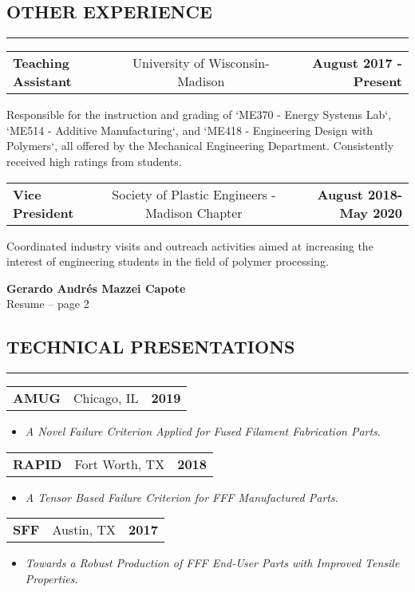 \documentclass[11pt,letterpaper]{article}
\makeatletter
\newcommand{\headerrow}[3]
{\vspace{0.4em}
\noindent
\begin{tabular*}{\textwidth}{l @{\extracolsep{\fill}} cr}
	\textbf{#1} & %
	#2 &		  %
	\textbf{#3}\\ %
\end{tabular*}}
\makeatother
\begin{document}
\subsection*{OTHER EXPERIENCE}

\vspace{-0.5em}
\hrule
	
	\headerrow
		{Teaching Assistant}
		{University of Wisconsin-Madison} 
		{August 2017 - Present}
		Responsible for the instruction and grading of `ME370 - Energy Systems Lab`, `ME514 - Additive Manufacturing`, and `ME418 - Engineering Design with Polymers`, all offered by the Mechanical Engineering Department. Consistently received high ratings from students.
	
	\headerrow
		{Vice President}
		{Society of Plastic Engineers - Madison Chapter} 
		{August 2018- May 2020}
		Coordinated industry visits and outreach activities aimed at increasing the interest of engineering students in the field of polymer processing.
	
\pagebreak %
\thispagestyle{empty} %

\begin{center}
	\LARGE \textbf{Gerardo Andrés Mazzei Capote} \\
	\normalsize Resume -- page 2
\end{center}

\subsection*{TECHNICAL PRESENTATIONS}

	\vspace{-0.5em}
	\hrule
	\headerrow
		{AMUG}
		{Chicago, IL}
		{2019}
	\begin{itemize}
		\item \emph{A Novel Failure Criterion Applied for Fused Filament Fabrication Parts}.
	\end{itemize}

	\headerrow
		{RAPID}{Fort Worth, TX}{2018}
	\begin{itemize}
		\item \emph{A Tensor Based Failure Criterion for FFF Manufactured Parts}.
	\end{itemize}

	\headerrow
		{SFF}
		{Austin, TX}
		{2017}
	\begin{itemize}
		\item \emph{Towards a Robust Production of FFF End-User Parts with Improved Tensile Properties}. 
	\end{itemize}
\end{document}

